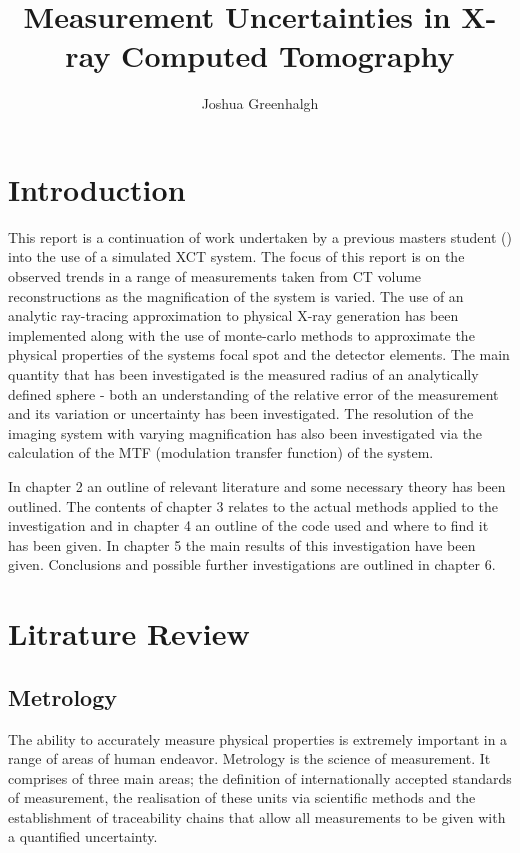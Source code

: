 \documentclass[
  twoside,
  11pt, a4paper,
  footinclude=true,
  headinclude=true,
  cleardoublepage=empty
]{scrbook}
\title{Measurement Uncertainties in X-ray Computed Tomography}
\author{Joshua Greenhalgh}
\begin{document}
\maketitle




\chapter{Introduction}

This report is a continuation of work undertaken by a previous masters student (\cite{Athens2015}) into the use of a simulated XCT system. The focus of this report is on the observed trends in a range of measurements taken from CT volume reconstructions as the magnification of the system is varied. The use of an analytic ray-tracing approximation to physical X-ray generation has been implemented along with the use of monte-carlo methods to approximate the physical properties of the systems focal spot and the detector elements. The main quantity that has been investigated is the measured radius of an analytically defined sphere - both an understanding of the relative error of the measurement and its variation or uncertainty has been investigated. The resolution of the imaging system with varying magnification has also been investigated via the calculation of the MTF (modulation transfer function) of the system.

In chapter 2 an outline of relevant literature and some necessary theory has been outlined. The contents of chapter 3 relates to the actual methods applied to the investigation and in chapter 4 an outline of the code used and where to find it has been given. In chapter 5 the main results of this investigation have been given. Conclusions and possible further investigations are outlined in chapter 6.



\chapter{Litrature Review}
\section{Metrology}
The ability to accurately measure physical properties is extremely important in a range of areas of human endeavor. Metrology is the science of measurement. It comprises of three main areas; the definition of internationally accepted standards of measurement, the realisation of these units via scientific methods and the establishment of traceability chains that allow all measurements to be given with a quantified uncertainty.
\end{document}
